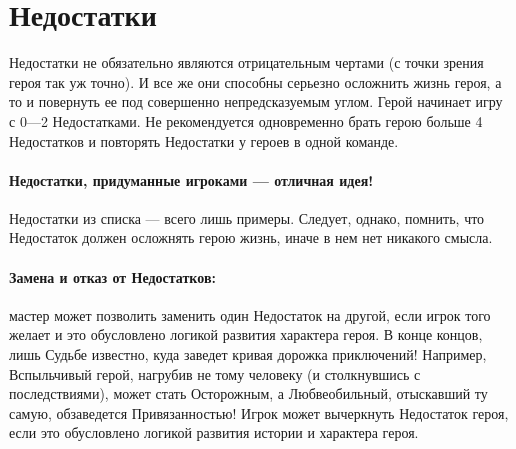 \section{Недостатки}
Недостатки не обязательно являются отрицательным чертами (с точки зрения героя так уж точно). И все же они способны серьезно осложнить жизнь героя, а то и повернуть ее под совершенно непредсказуемым углом. Герой начинает игру с 0—2 Недостатками. Не рекомендуется одновременно брать герою больше 4 Недостатков и повторять Недостатки у героев в одной команде. 
\paragraph{Недостатки, придуманные игроками — отличная идея!} Недостатки из списка — всего лишь примеры. Следует, однако, помнить, что Недостаток должен осложнять герою жизнь, иначе в нем нет никакого смысла.
\paragraph{Замена и отказ от Недостатков:} мастер может позволить заменить один Недостаток на другой, если игрок того желает и это обусловлено логикой развития характера героя. В конце концов, лишь Судьбе известно, куда заведет кривая дорожка приключений!
Например, Вспыльчивый герой, нагрубив не тому человеку (и столкнувшись с последствиями), может стать Осторожным, а Любвеобильный, отыскавший ту самую, обзаведется Привязанностью! Игрок может вычеркнуть Недостаток героя, если это обусловлено логикой развития истории и характера героя.

